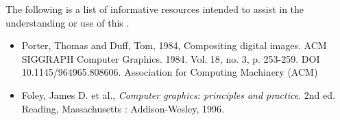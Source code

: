 
\pnum
The following is a list of informative resources intended to assist in the understanding or use of this \documenttypename{}.

\begin{itemize}
\item Porter, Thomas and Duff, Tom, 1984, Compositing digital images. ACM SIGGRAPH Computer Graphics. 1984. Vol. 18, no. 3, p. 253-259. DOI 10.1145/964965.808606. Association for Computing Machinery (ACM)
\item Foley, James D. et al., \textit{Computer graphics: principles and practice}. 2nd ed. Reading, Massachusetts : Addison-Wesley, 1996.
\end{itemize}
